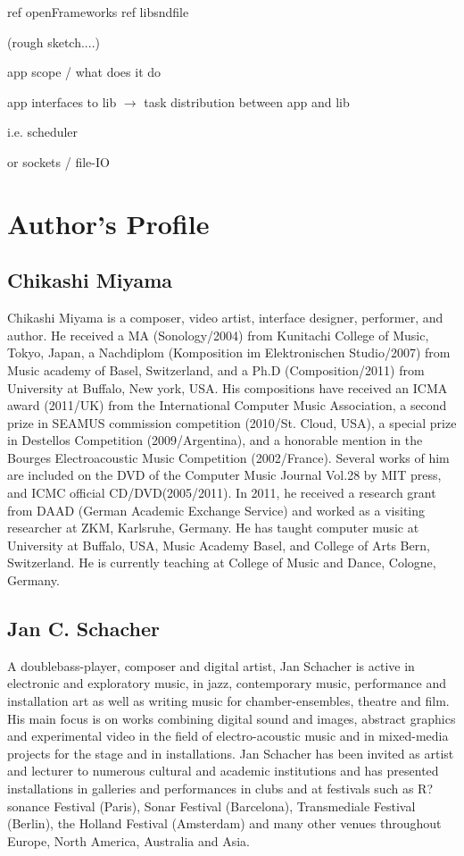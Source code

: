\documentclass[a4paper]{article}
\begin{document}
ref openFrameworks
ref libsndfile


(rough sketch....)

app scope / what does it do

app interfaces to lib $\rightarrow$ task distribution between app and lib

i.e. scheduler

or sockets / file-IO

\printbibliography


\section{Author's Profile}
\subsection*{Chikashi Miyama}
Chikashi Miyama is a composer, video artist, interface designer, performer, and author. He received a MA (Sonology/2004) from Kunitachi College of Music, Tokyo, Japan, a Nachdiplom (Komposition im Elektronischen Studio/2007) from Music academy of Basel, Switzerland, and a Ph.D (Composition/2011) from University at Buffalo, New york, USA. His compositions have received an ICMA award (2011/UK) from the International Computer Music Association, a second prize in SEAMUS commission competition (2010/St. Cloud, USA), a special prize in Destellos Competition (2009/Argentina), and a honorable mention in the Bourges Electroacoustic Music Competition (2002/France). Several works of him are included on the DVD of the Computer Music Journal Vol.28 by MIT press, and ICMC official CD/DVD(2005/2011). In 2011, he received a research grant from DAAD (German Academic Exchange Service) and worked as a visiting researcher at ZKM, Karlsruhe, Germany. He has taught computer music at  University at Buffalo, USA,  Music Academy Basel, and College of Arts Bern, Switzerland. He is currently teaching at College of Music and Dance, Cologne, Germany. 

\subsection*{Jan C. Schacher}
A doublebass-player, composer and digital artist, Jan Schacher is active in electronic and exploratory music, in jazz, contemporary music, performance and installation art as well as writing music for chamber-ensembles, theatre and film. His main focus is on works combining digital sound and images, abstract graphics and experimental video in the field of electro-acoustic music and in mixed-media projects for the stage and in installations. Jan Schacher has been invited as artist and lecturer to numerous cultural and academic institutions and has presented installations in galleries and performances in clubs and at festivals such as R?sonance Festival (Paris), Sonar Festival (Barcelona), Transmediale Festival (Berlin), the Holland Festival (Amsterdam) and many other venues throughout Europe, North America, Australia and Asia.
\end{document}
